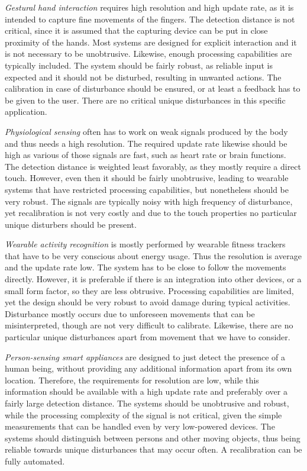 \emph{Gestural hand interaction} requires high resolution and high update rate, as it is intended to capture fine movements of the fingers. The detection distance is not critical, since it is assumed that the capturing device can be put in close proximity of the hands. Most systems are designed for explicit interaction and it is not necessary to be unobtrusive. Likewise, enough processing capabilities are typically included. The system should be fairly robust, as reliable input is expected and it should not be disturbed, resulting in unwanted actions. The calibration in case of disturbance should be ensured, or at least a feedback has to be given to the user. There are no critical unique disturbances in this specific application.

\emph{Physiological sensing} often has to work on weak signals produced by the body and thus needs a high resolution. The required update rate likewise should be high as various of those signals are fast, such as heart rate or brain functions. The detection distance is weighted least favorably, as they mostly require a direct touch. However, even then it should be fairly unobtrusive, leading to wearable systems that have restricted processing capabilities, but nonetheless should be very robust. The signals are typically noisy with high frequency of disturbance, yet recalibration is not very costly and due to the touch properties no particular unique disturbers should be present. 

\emph{Wearable activity recognition} is mostly performed by wearable fitness trackers that have to be very conscious about energy usage. Thus the resolution is average and the update rate low. The system has to be close to follow the movements directly. However, it is preferable if there is an integration into other devices, or a small form factor, so they are less obtrusive. Processing capabilities are limited, yet the design should be very robust to avoid damage during typical activities. Disturbance mostly occurs due to unforeseen movements that can be misinterpreted, though are not very difficult to calibrate. Likewise, there are no particular unique disturbances apart from movement that we have to consider.

\emph{Person-sensing smart appliances} are designed to just detect the presence of a human being, without providing any additional information apart from its own location. Therefore, the requirements for resolution are low, while this information should be available with a high update rate and preferably over a fairly large detection distance. The systems should be unobtrusive and robust, while the processing complexity of the signal is not critical, given the simple measurements that can be handled even by very low-powered devices. The systems should distinguish between persons and other moving objects, thus being reliable towards unique disturbances that may occur often. A recalibration can be fully automated.

